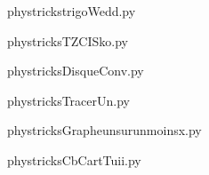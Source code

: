     \newcommand{\CaptionFigtrigoWedd}{<+Type your caption here+>}
    \begin{center}
        
    \end{center}
    phystrickstrigoWedd.py

    

    \clearpage
    


    \newcommand{\CaptionFigTZCISko}{<+Type your caption here+>}
    \begin{center}
        
    \end{center}
    phystricksTZCISko.py

    

    \clearpage
    


    \newcommand{\CaptionFigDisqueConv}{<+Type your caption here+>}
    \begin{center}
        
    \end{center}
    phystricksDisqueConv.py

    

    \clearpage
    


    \newcommand{\CaptionFigTracerUn}{<+Type your caption here+>}
    \begin{center}
        
    \end{center}
    phystricksTracerUn.py

    

    \clearpage
    


    \newcommand{\CaptionFigGrapheunsurunmoinsx}{<+Type your caption here+>}
    \begin{center}
        
    \end{center}
    phystricksGrapheunsurunmoinsx.py

    

    \clearpage
    


    \newcommand{\CaptionFigCbCartTuii}{<+Type your caption here+>}
    \begin{center}
        
    \end{center}
    phystricksCbCartTuii.py

